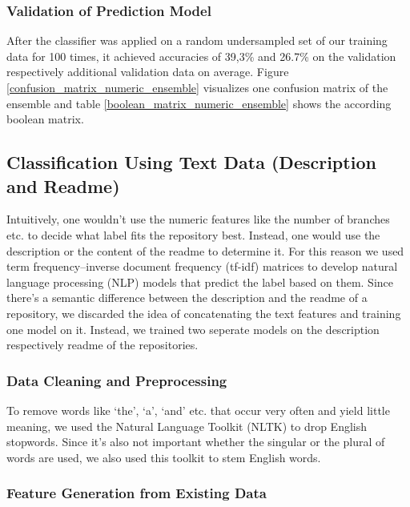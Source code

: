 \documentclass[%
a4paper,
DIV12,
2.5headlines,
bigheadings,
titlepage,
openbib,
]{scrartcl}
\begin{document}
\subsubsection{Validation of Prediction
Model}\label{validation-of-prediction-model}

After the classifier was applied on a random undersampled set of our training data for 100 times, it achieved accuracies of 39,3\% and 26.7\% on the validation respectively additional validation data on average.
Figure \ref{confusion_matrix_numeric_ensemble} visualizes one confusion matrix of the ensemble and table \ref{boolean_matrix_numeric_ensemble} shows the according boolean matrix.

\subsection{Classification Using Text Data (Description and
Readme)}\label{classification-using-text-data-description-and-readme}

Intuitively, one wouldn't use the numeric features like the number of branches etc. to decide what label fits the repository best.
Instead, one would use the description or the content of the readme to determine it.
For this reason we used term frequency--inverse document frequency (tf-idf) matrices to develop natural language processing (NLP) models that predict the label based on them.
Since there's a semantic difference between the description and the readme of a repository, we discarded the idea of concatenating the text features and training one model on it.
Instead, we trained two seperate models on the description respectively readme of the repositories.

\subsubsection{Data Cleaning and
Preprocessing}\label{data-cleaning-and-preprocessing-1}

To remove words like `the', `a', `and' etc. that occur very often and yield little meaning, we used the Natural Language Toolkit (NLTK) to drop English stopwords.
Since it's also not important whether the singular or the plural of words are used, we also used this toolkit to stem English words.

\subsubsection{Feature Generation from Existing
Data}\label{feature-generation-from-existing-data}
\end{document}
